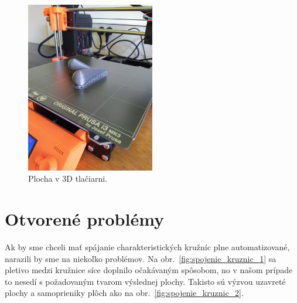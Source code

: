 \begin{figure}[h]
	\centering	\includegraphics[angle=-90,width=0.5\textwidth]{images/plocha_v_tlaciarni.jpg}
	\caption[Plocha v 3D tlačiarni.]{Plocha v 3D tlačiarni.}
	\label{fig:plocha_v_tlaciarni}
\end{figure}

\section{Otvorené problémy}
Ak by sme chceli mať spájanie charakteristických kružníc plne automatizované, 
narazili by sme na niekoľko problémov. Na obr.~\ref{fig:spojenie_kruznic_1} sa pletivo medzi kružnice síce doplnilo očakávaným spôsobom, no v našom prípade to nesedí s požadovaným tvarom výslednej plochy.
Takisto sú výzvou uzavreté plochy a samoprieniky plôch ako na obr.~\ref{fig:spojenie_kruznic_2}.

